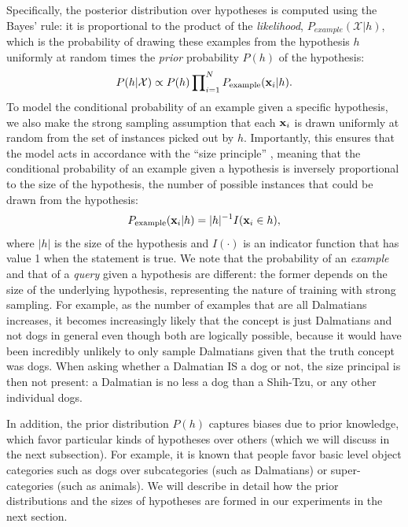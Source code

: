 Specifically, the posterior distribution over hypotheses is computed using the Bayes' rule: it is proportional to the product of the {\em likelihood}, $P_{example}(\mathcal{X} | h)$, which is the probability of drawing these examples from the hypothesis $h$ uniformly at random times the {\em prior} probability $P(h)$ of the hypothesis:
\begin{equation}
    P(h|\mathcal{X}) \propto P(h)\prod\nolimits_{i=1}^{N}P_{\mathrm{example}}(\mathbf{x}_i | h).
\end{equation}
To model the conditional probability of an example given a specific hypothesis, we also make the strong sampling assumption that each $\mathbf{x}_i$ is drawn uniformly at random from the set of instances picked out by $h$. Importantly, this ensures that the model acts in accordance with the ``size principle'' \cite{tenenbaum99,tenenbaum2001generalization}, meaning that the conditional probability of an example given a hypothesis is inversely proportional to the size of the hypothesis, \ie the number of possible instances that could be drawn from the hypothesis:
\begin{equation}
    P_{\mathrm{example}}(\mathbf{x}_i | h) = |h|^{-1}I(\mathbf{x}_i \in h),
\end{equation}
where $|h|$ is the size of the hypothesis and $I(\cdot)$ is an indicator function that has value 1 when the statement is true. We note that the probability of an \emph{example} and that of a \emph{query} given a hypothesis are different: the former depends on the size of the underlying hypothesis, representing the nature of training with strong sampling. For example, as the number of examples that are all Dalmatians increases, it becomes increasingly likely that the concept is just Dalmatians and not dogs in general even though both are logically possible, because it would have been incredibly unlikely to only sample Dalmatians given that the truth concept was dogs. When asking whether a Dalmatian IS a dog or not, the size principal is then not present: a Dalmatian is no less a dog than a Shih-Tzu, or any other individual dogs.

In addition, the prior distribution $P(h)$ captures biases due to prior knowledge, which favor particular kinds of hypotheses over others (which we will discuss in the next subsection). For example, it is known that people favor basic level object categories such as dogs over subcategories (such as Dalmatians) or super-categories (such as animals). We will describe in detail how the prior distributions and the sizes of hypotheses are formed in our experiments in the next section.


